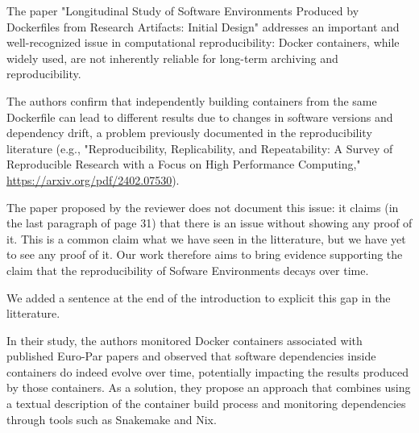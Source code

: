 \documentclass[%
	11pt,
	final,
]{article}
\begin{document}
The paper "Longitudinal Study of Software Environments Produced by Dockerfiles from Research Artifacts: Initial Design" addresses an important and well-recognized issue in computational reproducibility: Docker containers, while widely used, are not inherently reliable for long-term archiving and reproducibility. 

The authors confirm that independently building containers from the same Dockerfile can lead to different results due to changes in software versions and dependency drift, a problem previously documented in the reproducibility literature (e.g., "Reproducibility, Replicability, and Repeatability: A Survey of Reproducible Research with a Focus on High Performance Computing," \url{https://arxiv.org/pdf/2402.07530}).

\begin{review-answer}
The paper proposed by the reviewer does not document this issue: it claims (in the last paragraph of page 31) that there is an issue without showing any proof of it.
This is a common claim what we have seen in the litterature, but we have yet to see any proof of it.
Our work therefore aims to bring evidence supporting the claim that the reproducibility of Sofware Environments decays over time.

We added a sentence at the end of the introduction to explicit this gap in the litterature.
\end{review-answer}

In their study, the authors monitored Docker containers associated with published Euro-Par papers and observed that software dependencies inside containers do indeed evolve over time, potentially impacting the results produced by those containers.
As a solution, they propose an approach that combines using a textual description of the container build process and monitoring dependencies through tools such as Snakemake and Nix.
\end{document}
